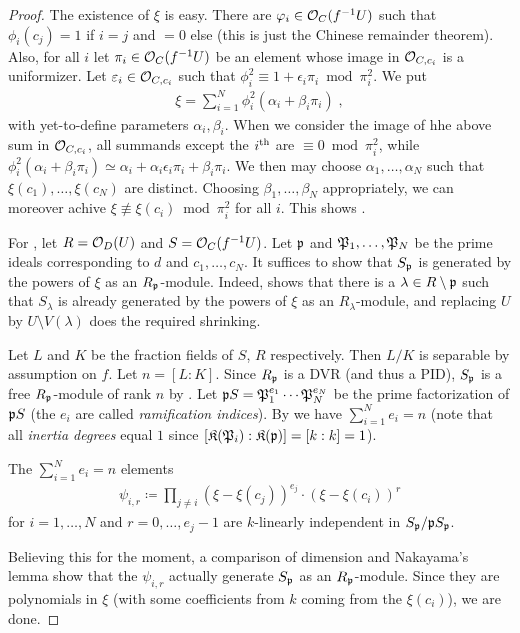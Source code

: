 \documentclass[a4paper,parskip=half,numbers=enddot, DIV=12]{scrreprt}
\begin{document}
\begin{proof}
	The existence of $\xi$ is easy. There are $\varphi_i\in\mathcal{O}_C(f^{-1}U)$ such that $\phi_i(c_j)=1$ if $i=j$ and $=0$ else (this is just the Chinese remainder theorem). Also, for all $i$ let $\pi_i\in\mathcal{O}_C(f^{-1}U)$ be an element whose image in $\mathcal{O}_{C,c_i}$ is a uniformizer. Let $\varepsilon_i\in\mathcal{O}_{C,c_i}$ such that $\phi_i^2\equiv 1+\epsilon_i\pi_i\bmod\pi_i^2$. We put
	\begin{align*}
		\xi=\sum_{i=1}^N\phi_i^2(\alpha_i+\beta_i\pi_i)\;,
	\end{align*}
	with yet-to-define parameters $\alpha_i,\beta_i$. When we consider the image of hhe above sum in $\mathcal{O}_{C,c_i}$, all summands except the $i^{\text{th}}$ are $\equiv 0\bmod \pi_i^2$, while $\phi_i^2(\alpha_i+\beta_i\pi_i)\simeq \alpha_i+\alpha_i\epsilon_i\pi_i+\beta_i\pi_i$. We then may choose $\alpha_1,\ldots,\alpha_N$ such that $\xi(c_1),\ldots,\xi(c_N)$ are distinct. Choosing $\beta_1,\ldots,\beta_N$ appropriately, we can moreover achive $\xi\not\equiv\xi(c_i)\bmod \pi_i^2$ for all $i$. This shows .
	
	For , let $R=\mathcal{O}_D(U)$ and $S=\mathcal{O}_C(f^{-1}U)$. Let $\mathfrak{p}$ and $\mathfrak{P}_1,\ldots,\mathfrak{P}_N$ be the prime ideals corresponding to $d$ and $c_1,\ldots,c_N$. It suffices to show that $S_{\mathfrak{p}}$ is generated by the powers of $\xi$ as an $R_{\mathfrak{p}}$-module. Indeed, \cite[Lemma~1.5.1]{alg2} shows that there is a $\lambda\in R\setminus\mathfrak{p}$ such that $S_\lambda$ is already generated by the powers of $\xi$ as an $R_\lambda$-module, and replacing $U$ by $U\setminus V(\lambda)$ does the required shrinking.
	
	Let $L$ and $K$ be the fraction fields of $S$, $R$ respectively. Then $L/K$ is separable by assumption on $f$. Let $n=[L:K]$. Since $R_{\mathfrak{p}}$ is a DVR (and thus a PID), $S_{\mathfrak{p}}$ is a free $R_{\mathfrak{p}}$-module of rank $n$ by \cite[Ch.~I, (2.10)]{NEUKIRCH}. Let $\mathfrak{p} S=\mathfrak{P}_1^{e_1}\cdots \mathfrak{P}_N^{e_N}$ be the prime factorization of $\mathfrak{p} S$ (the $e_i$ are called \emph{ramification indices}). By \cite[Ch.~I, (8.2)]{NEUKIRCH} we have $\sum_{i=1}^Ne_i=n$ (note that all \emph{inertia degrees} equal $1$ since $[\mathfrak{K}(\mathfrak{P}_i):\mathfrak{K}(\mathfrak{p})]=[k:k]=1$). 
	\begin{claim}
		 The $\sum_{i=1}^Ne_i=n$ elements
		 \begin{align*}
			 \psi_{i,r}\coloneqq\prod_{j\neq i}\left(\xi-\xi(c_j)\right)^{e_j}\cdot \left(\xi-\xi(c_i)\right)^r
		 \end{align*}
		 for $i=1,\ldots,N$ and $r=0,\ldots,e_j-1$ are $k$-linearly independent in $S_{\mathfrak{p}}/\mathfrak{p} S_{\mathfrak{p}}$.
	\end{claim}
	Believing this for the moment, a comparison of dimension and Nakayama's lemma show that the $\psi_{i,r}$ actually generate $S_{\mathfrak{p}}$ as an $R_{\mathfrak{p}}$-module. Since they are polynomials in $\xi$ (with some coefficients from $k$ coming from the $\xi(c_i)$), we are done.
	

\end{proof}
\end{document}
